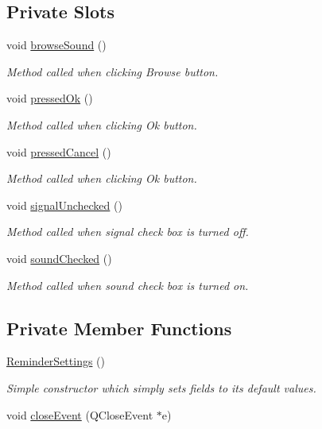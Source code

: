 \subsection*{Private Slots}
\begin{DoxyCompactItemize}
\item 
void \hyperlink{class_reminder_settings_ace19a0c8eb7609c813ea9b1a80a2927e}{browse\-Sound} ()
\begin{DoxyCompactList}\small\item\em Method called when clicking Browse button. \end{DoxyCompactList}\item 
void \hyperlink{class_reminder_settings_ac5d4723f0934c9c416d00bba5af2ff07}{pressed\-Ok} ()
\begin{DoxyCompactList}\small\item\em Method called when clicking Ok button. \end{DoxyCompactList}\item 
void \hyperlink{class_reminder_settings_a8c4ff4563087376a613cb358454c6519}{pressed\-Cancel} ()
\begin{DoxyCompactList}\small\item\em Method called when clicking Ok button. \end{DoxyCompactList}\item 
void \hyperlink{class_reminder_settings_aa059221c469505ff2b7abf8264303c5c}{signal\-Unchecked} ()
\begin{DoxyCompactList}\small\item\em Method called when signal check box is turned off. \end{DoxyCompactList}\item 
void \hyperlink{class_reminder_settings_a95cbf65638838f46f5a7b8731ca92114}{sound\-Checked} ()
\begin{DoxyCompactList}\small\item\em Method called when sound check box is turned on. \end{DoxyCompactList}\end{DoxyCompactItemize}
\subsection*{Private Member Functions}
\begin{DoxyCompactItemize}
\item 
\hyperlink{class_reminder_settings_a978cf43b0d5e75cbecc86d9c4a32595d}{Reminder\-Settings} ()
\begin{DoxyCompactList}\small\item\em Simple constructor which simply sets fields to its default values. \end{DoxyCompactList}\item 
void \hyperlink{class_reminder_settings_a89932f2ad7630db43cff75838eca7efc}{close\-Event} (Q\-Close\-Event $\ast$e)
\end{DoxyCompactItemize}
